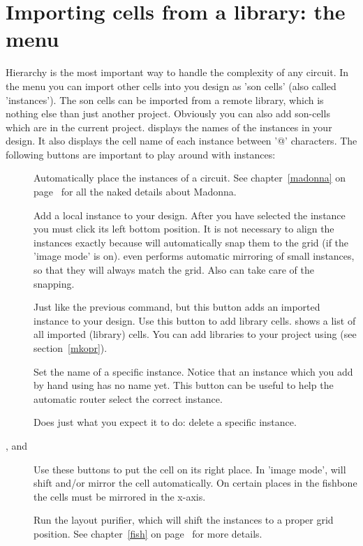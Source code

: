 \section{Importing cells from a library: the \protect{} menu}
\label{instances}
Hierarchy is the most important way to handle the complexity of any
circuit. In the  menu you can import other cells into
you design as 'son cells' (also called 'instances').  The son cells can
be imported from a remote library, which is nothing else than just
another project. Obviously you can also add son-cells which are in the
current project. 
 displays the names of the instances in your design.
It also displays the cell name of each instance between '@' characters.
The following buttons are important to play around with instances:
\begin{description}
\item[]
Automatically place the instances of a circuit.
See chapter~\ref{madonna} on page~\pageref{madonna} for 
all the naked details about Madonna.
\item[]
Add a local instance to your design. After you have selected the instance
you must click its left bottom position. It is not necessary
to align the instances exactly because  will
automatically snap them to the grid (if the 'image mode' is on). 
even performs automatic mirroring of small instances, so that they will
always match the grid. Also  can take care of the snapping.
\item[]
Just like the previous command, but this button adds an imported
instance to your design. Use this button to add library cells. 
shows a list of all imported (library) cells. You can add libraries to your
project using  (see section~\ref{mkopr}).
\item[]
Set the name of a specific instance. Notice that an instance which you
add by hand using  has no name yet. This button can be
useful to help the automatic router select the correct instance.
\item[]
Does just what you expect it to do: delete a specific instance.
\item[,  and ]
Use these buttons to put the cell on its right place. In 'image mode',
 will shift and/or mirror the cell automatically. 
On certain places in the fishbone the cells must be mirrored in the
x-axis.
\item[]
Run the layout purifier, which will shift the instances to
a proper grid position. See chapter~\ref{fish} on page~\pageref{fish}
for more details.
\end{description}
